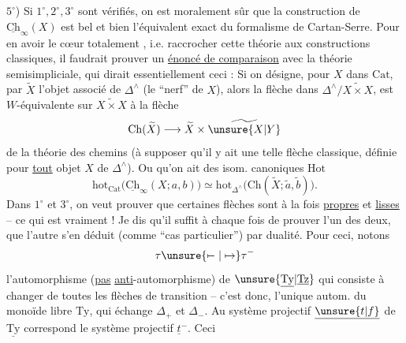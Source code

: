 $5^\circ$) Si $1^\circ,2^\circ,3^\circ$ sont vérifiés, on est moralement
sûr que la construction de $\underline{\mathrm{Ch}}_{\infty}(X)$ est bel
et bien l'équivalent exact du formalisme de
Cartan-Serre. Pour en avoir le cœur totalement
, i.e. raccrocher  cette théorie aux
constructions classiques, il faudrait  prouver un
\uline{énoncé de comparaison} avec la théorie
semisimpliciale, qui dirait essentiellement
ceci : Si on désigne, pour $X$ dans $\mathrm{Cat}$, par
$\widetilde X$ l'objet associé de $\mathbb{\Delta}^{\wedge}$ (le ``nerf'' de $X$),
alors la flèche
 dans $\mathbb{\Delta}^{\wedge}/\widetilde{X\times X}$, est
$W$-équivalente sur $\widetilde{X\times X}$ à la flèche
\[
\mathrm{Ch}(\widetilde X)\longrightarrow\widetilde X\times\widetilde{\unsure{X|Y}}
\]
de la théorie  des chemins (à
supposer qu'il y ait une telle flèche classique,
définie pour \uline{tout} objet $X$ de $\mathbb{\Delta}^{\wedge}$). Ou
qu'on ait  des isom. canoniques  $\mathrm{Hot}$
\[
\mathrm{hot}_{\mathrm{Cat}}\bigl(\underline{\mathrm{Ch}}_{\infty}(X;a,b)\bigr)
\simeq\mathrm{hot}_{\mathbb{\Delta}^{\wedge}}\bigl(\mathrm{Ch}(\widetilde X;\tilde a,\tilde b)\bigr).
\]
Dans $1^\circ$ et $3^\circ$, on veut prouver que certaines flèches
 sont à la fois \uline{propres} et \uline{lisses} -- ce qui est vraiment
 ! Je dis qu'il suffit à chaque fois de
prouver l'un des deux, que l'autre s'en déduit
(comme ``cas particulier'') par dualité. Pour ceci,
notons
\[
\tau\unsure{\mapstochar\relbar|\mapsto}\tau^{-}
\]
l'automorphisme (\uline{pas} \uline{anti}-automorphisme) de
$\unsure{\underline{\mathrm{Ty}}|\underline{\mathrm{Tz}}}$ qui consiste à changer de  toutes les
flèches de transition -- c'est donc,  l'unique
autom. du monoïde libre $\mathrm{Ty}$, qui échange
$\Delta_+$ et $\Delta_-$. Au système projectif $\underline{\unsure{t|f}}$ de $\underline{\mathrm{Ty}}$
correspond le système projectif $\underline t^{-}$. Ceci
